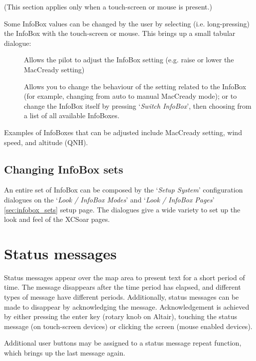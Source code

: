 (This section applies only when a touch-screen or mouse is present.)

Some InfoBox values can be changed by the user by selecting (i.e. long-pressing) the
InfoBox with the touch-screen or mouse.  This brings up a small tabular dialogue:

\begin{description}
\item[]
  Allows the pilot to adjust the InfoBox setting (e.g. raise or lower the
  MacCready setting)

\item[]
  Allows you to change the behaviour of the setting related to the InfoBox
  (for example, changing from auto to manual MacCready mode); or
  to change the InfoBox itself by pressing `{\it Switch InfoBox}', then
  choosing from a list of all available InfoBoxes.

\end{description}

Examples of InfoBoxes that can
be adjusted include MacCready setting, wind speed, and altitude (QNH).


\subsection*{Changing InfoBox sets}

An entire set of InfoBox can be composed by the `{\it Setup System}' configuration
dialogues on the `{\it Look / InfoBox Modes}' and `{\it Look / InfoBox Pages}'
\ref{sec:infobox_sets} setup page.
The dialogues give a wide variety to set up the look and feel of the XCSoar pages.


\section{Status messages}

Status messages appear over the map area to present text for a short period of
time.  The message disappears after the time period has elapsed, and different
types of message have different periods. Additionally, status messages can be
made to disappear by acknowledging the message.  Acknowledgement is achieved by
either pressing the enter key (rotary knob on Altair), touching the status
message (on touch-screen devices) or clicking the screen (mouse enabled devices).

Additional user buttons may be assigned to a status message repeat function,
which brings up the last message again.

